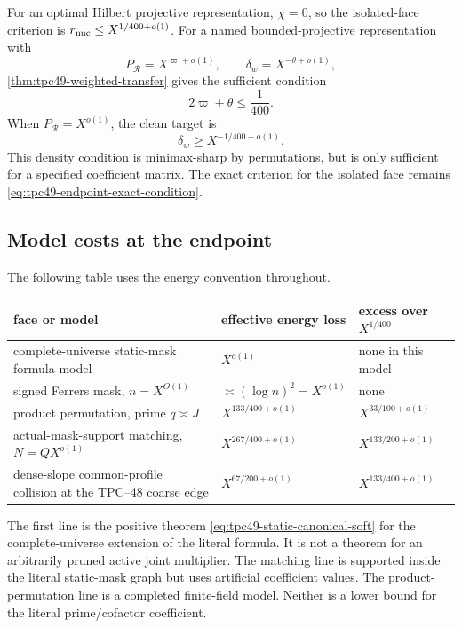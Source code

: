 For an optimal Hilbert projective representation, \(\chi=0\), so the
isolated-face criterion is \(r_{\rm nuc}\le X^{1/400+o(1)}\).  For a
named bounded-projective representation with
\begin{equation}
 P_{\mathscr R}=X^{\varpi+o(1)},
 \qquad
 \delta_w=X^{-\theta+o(1)},
 \label{eq:tpc49-density-ledger-exponents}
\end{equation}
\cref{thm:tpc49-weighted-transfer} gives the sufficient condition
\begin{equation}
 2\varpi+\theta\le\frac1{400}.
 \label{eq:tpc49-density-sufficient-condition}
\end{equation}
When \(P_{\mathscr R}=X^{o(1)}\), the clean target is
\begin{equation}
 \delta_w\ge X^{-1/400+o(1)}.
 \label{eq:tpc49-density-threshold}
\end{equation}
This density condition is minimax-sharp by permutations, but is only
sufficient for a specified coefficient matrix.  The exact criterion for
the isolated face remains \eqref{eq:tpc49-endpoint-exact-condition}.

\subsection{Model costs at the endpoint}

The following table uses the energy convention throughout.
\begin{center}
\begin{tabular}{@{}p{}p{}p{}@{}}
\toprule
face or model & effective energy loss & excess over \(X^{1/400}\) \\
\midrule
complete-universe static-mask formula model
 & \(X^{o(1)}\)
 & none in this model \\
signed Ferrers mask, \(n=X^{O(1)}\)
 & \(\asymp(\log n)^2=X^{o(1)}\)
 & none \\
product permutation, prime \(q\asymp J\)
 & \(X^{133/400+o(1)}\)
 & \(X^{33/100+o(1)}\) \\
actual-mask-support matching, \(N=QX^{o(1)}\)
 & \(X^{267/400+o(1)}\)
 & \(X^{133/200+o(1)}\) \\
dense-slope common-profile collision at the TPC--48 coarse edge
 & \(X^{67/200+o(1)}\)
 & \(X^{133/400+o(1)}\) \\
\bottomrule
\end{tabular}
\end{center}

The first line is the positive theorem
\eqref{eq:tpc49-static-canonical-soft} for the complete-universe
extension of the literal formula.  It
is not a theorem for an arbitrarily pruned active joint multiplier.  The
matching line is supported inside the literal static-mask graph but
uses artificial coefficient values.  The product-permutation line is a
completed finite-field model.  Neither is a lower bound for the literal
prime/cofactor coefficient.

